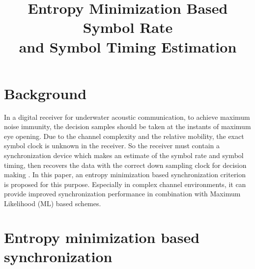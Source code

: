 \documentclass[conference, onecolumn]{IEEEtran}
\begin{document}
%
\title{Entropy Minimization Based Symbol Rate\\ 
and Symbol Timing Estimation}


\author{



}


\maketitle

\IEEEpeerreviewmaketitle


\section{Background}


In a digital receiver for underwater acoustic communication, to achieve maximum noise immunity, the decision samples should be taken at the instants of maximum eye opening. 
Due to the channel complexity and the relative mobility, the exact symbol clock is unknown in the receiver.  
So the receiver must contain a synchronization device which makes an estimate of the symbol rate and symbol timing, 
then recovers the data with the correct down sampling clock for decision making \cite{mengali1997synchronization}.  
In this paper, an entropy minimization based synchronization criterion is proposed for this purpose.
Especially in complex channel environments, it can provide improved synchronization performance in combination with Maximum Likelihood (ML) based schemes.

\section{Entropy minimization based synchronization}
\end{document}
